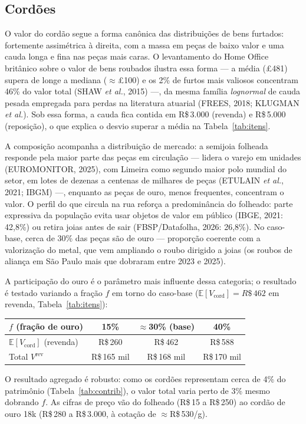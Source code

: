 \documentclass[11pt,a4paper]{article}
\newcommand{\reais}[1]{R\$\,#1}
\begin{document}
\subsection{Cordões}
O valor do cordão segue a forma canônica das distribuições de bens furtados: fortemente
assimétrica à direita, com a massa em peças de baixo valor e uma cauda longa e fina nas peças mais
caras. O levantamento do Home Office britânico sobre o valor de bens roubados ilustra essa forma
--- a média (\pounds481) supera de longe a mediana ($\approx$\pounds100) e os 2\% de furtos mais
valiosos concentram 46\% do valor total (SHAW \emph{et al.}, 2015) ---, da mesma família
\emph{lognormal} de cauda pesada empregada para perdas na literatura atuarial (FREES, 2018; KLUGMAN
\emph{et al.}). Sob essa forma, a cauda fica contida em \reais{3.000} (revenda) e \reais{5.000}
(reposição), o que explica o desvio superar a média na Tabela~\ref{tab:itens}.

A composição acompanha a distribuição de mercado: a semijoia folheada responde pela maior parte das
peças em circulação --- lidera o varejo em unidades (EUROMONITOR, 2025), com Limeira como segundo
maior polo mundial do setor, em lotes de dezenas a centenas de milhares de peças (ETULAIN
\emph{et al.}, 2021; IBGM) ---, enquanto as peças de ouro, menos frequentes, concentram o valor. O
perfil do que circula na rua reforça a predominância do folheado: parte expressiva da população
evita usar objetos de valor em público (IBGE, 2021: 42,8\%) ou retira joias antes de sair
(FBSP/Datafolha, 2026: 26,8\%). No caso-base, cerca de 30\% das peças são de ouro --- proporção
coerente com a valorização do metal, que vem ampliando o roubo dirigido a joias (os roubos de
aliança em São Paulo mais que dobraram entre 2023 e 2025).

A participação do ouro é o parâmetro mais influente dessa categoria; o resultado é testado variando
a fração $f$ em torno do caso-base ($\mathbb{E}[V_{\text{cord}}]=\reais{462}$ em revenda,
Tabela~\ref{tab:itens}):
\begin{center}\small
\begin{tabular}{lccc}
\toprule
$f$ (fração de ouro) & 15\% & $\approx$30\% (base) & 40\% \\
\midrule
$\mathbb{E}[V_{\text{cord}}]$ (revenda) & \reais{260} & \reais{462} & \reais{588} \\
Total $V^{\text{rev}}$ & \reais{165} mil & \reais{168} mil & \reais{170} mil \\
\bottomrule
\end{tabular}
\end{center}
O resultado agregado é robusto: como os cordões representam cerca de 4\% do patrimônio
(Tabela~\ref{tab:contrib}), o valor total varia perto de 3\% mesmo dobrando $f$. As cifras de preço
vão do folheado (\reais{15} a \reais{250}) ao cordão de ouro 18k (\reais{280} a \reais{3.000}, à
cotação de $\approx$\reais{530}/g).
\end{document}

